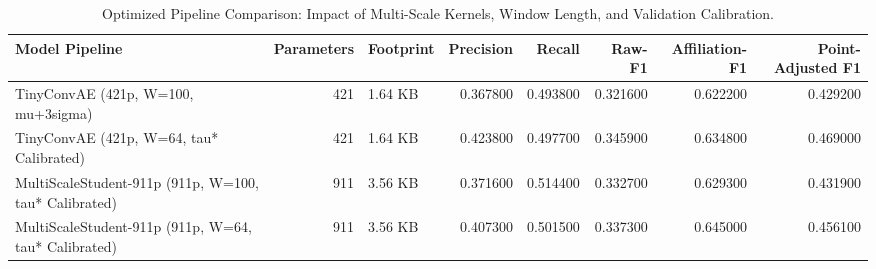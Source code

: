 \begin{table}
\caption{Optimized Pipeline Comparison: Impact of Multi-Scale Kernels, Window Length, and Validation Calibration.}
\begin{tabular}{lrlrrrrr}
\toprule
Model Pipeline & Parameters & Footprint & Precision & Recall & Raw-F1 & Affiliation-F1 & Point-Adjusted F1 \\
\midrule
TinyConvAE (421p, W=100, mu+3sigma) & 421 & 1.64 KB & 0.367800 & 0.493800 & 0.321600 & 0.622200 & 0.429200 \\
TinyConvAE (421p, W=64, tau* Calibrated) & 421 & 1.64 KB & 0.423800 & 0.497700 & 0.345900 & 0.634800 & 0.469000 \\
MultiScaleStudent-911p (911p, W=100, tau* Calibrated) & 911 & 3.56 KB & 0.371600 & 0.514400 & 0.332700 & 0.629300 & 0.431900 \\
MultiScaleStudent-911p (911p, W=64, tau* Calibrated) & 911 & 3.56 KB & 0.407300 & 0.501500 & 0.337300 & 0.645000 & 0.456100 \\
\bottomrule
\end{tabular}
\end{table}
